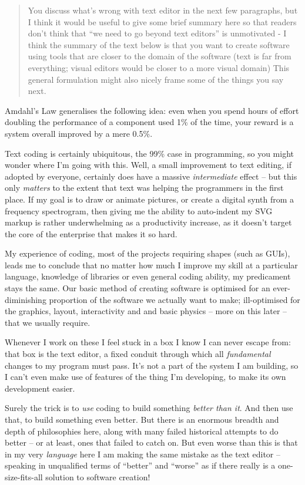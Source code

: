 \documentclass[english,submission]{programming}
\begin{document}
\begin{quote}
You discuss what's wrong with text editor in the next few paragraphs,
but I think it would be useful to give some brief summary here so that
readers don't think that ``we need to go beyond text editors'' is
unmotivated - I think the summary of the text below is that you want to
create software using tools that are closer to the domain of the
software (text is far from everything; visual editors would be closer to
a more visual domain) This general formulation might also nicely frame
some of the things you say next.
\end{quote}

Amdahl's Law generalises the following idea: even when you spend hours
of effort doubling the performance of a component used 1\% of the time,
your reward is a system overall improved by a mere 0.5\%.

Text coding is certainly ubiquitous, the 99\% case in programming, so
you might wonder where I'm going with this. Well, a small improvement to
text editing, if adopted by everyone, certainly does have a massive
\emph{intermediate} effect -- but this only \emph{matters} to the extent
that text was helping the programmers in the first place. If my goal is
to draw or animate pictures, or create a digital synth from a frequency
spectrogram, then giving me the ability to auto-indent my SVG markup is
rather underwhelming as a productivity increase, as it doesn't target
the core of the enterprise that makes it so hard.

My experience of coding, most of the projects requiring shapes (such as
GUIs), leads me to conclude that no matter how much I improve my skill
at a particular language, knowledge of libraries or even general coding
ability, my predicament stays the same. Our basic method of creating
software is optimised for an ever-diminishing proportion of the software
we actually want to make; ill-optimised for the graphics, layout,
interactivity and and basic physics -- more on this later -- that we
usually require.

Whenever I work on these I feel stuck in a box I know I can never escape
from: that box is the text editor, a fixed conduit through which all
\emph{fundamental} changes to my program must pass. It's not a part of
the system I am building, so I can't even make use of features of the
thing I'm developing, to make its own development easier.

Surely the trick is to \emph{use} coding to build something \emph{better
than it}. And then use that, to build something even better. But there
is an enormous breadth and depth of philosophies here, along with many
failed historical attempts to do better -- or at least, ones that failed
to catch on. But even worse than this is that in my very \emph{language}
here I am making the same mistake as the text editor -- speaking in
unqualified terms of ``better'' and ``worse'' as if there really is a
one-size-fits-all solution to software creation!
\end{document}
